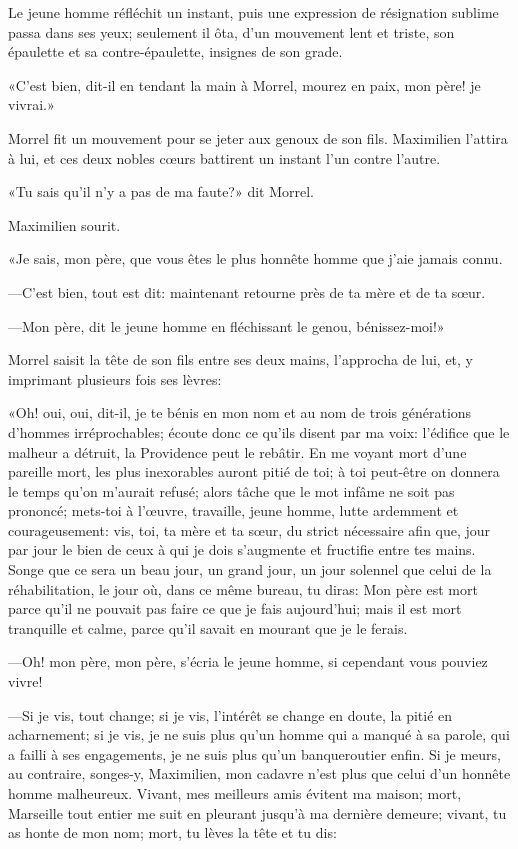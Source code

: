 Le jeune homme réfléchit un instant, puis une expression de résignation sublime passa dans ses yeux; seulement il ôta, d'un mouvement lent et triste, son épaulette et sa contre-épaulette, insignes de son grade.

«C'est bien, dit-il en tendant la main à Morrel, mourez en paix, mon père! je vivrai.»

Morrel fit un mouvement pour se jeter aux genoux de son fils. Maximilien l'attira à lui, et ces deux nobles cœurs battirent un instant l'un contre l'autre.

«Tu sais qu'il n'y a pas de ma faute?» dit Morrel.

Maximilien sourit.

«Je sais, mon père, que vous êtes le plus honnête homme que j'aie jamais connu.

—C'est bien, tout est dit: maintenant retourne près de ta mère et de ta sœur.

—Mon père, dit le jeune homme en fléchissant le genou, bénissez-moi!»

Morrel saisit la tête de son fils entre ses deux mains, l'approcha de lui, et, y imprimant plusieurs fois ses lèvres:

«Oh! oui, oui, dit-il, je te bénis en mon nom et au nom de trois générations d'hommes irréprochables; écoute donc ce qu'ils disent par ma voix: l'édifice que le malheur a détruit, la Providence peut le rebâtir. En me voyant mort d'une pareille mort, les plus inexorables auront pitié de toi; à toi peut-être on donnera le temps qu'on m'aurait refusé; alors tâche que le mot infâme ne soit pas prononcé; mets-toi à l'œuvre, travaille, jeune homme, lutte ardemment et courageusement: vis, toi, ta mère et ta sœur, du strict nécessaire afin que, jour par jour le bien de ceux à qui je dois s'augmente et fructifie entre tes mains. Songe que ce sera un beau jour, un grand jour, un jour solennel que celui de la réhabilitation, le jour où, dans ce même bureau, tu diras: Mon père est mort parce qu'il ne pouvait pas faire ce que je fais aujourd'hui; mais il est mort tranquille et calme, parce qu'il savait en mourant que je le ferais.

—Oh! mon père, mon père, s'écria le jeune homme, si cependant vous pouviez vivre!

—Si je vis, tout change; si je vis, l'intérêt se change en doute, la pitié en acharnement; si je vis, je ne suis plus qu'un homme qui a manqué à sa parole, qui a failli à ses engagements, je ne suis plus qu'un banqueroutier enfin. Si je meurs, au contraire, songes-y, Maximilien, mon cadavre n'est plus que celui d'un honnête homme malheureux. Vivant, mes meilleurs amis évitent ma maison; mort, Marseille tout entier me suit en pleurant jusqu'à ma dernière demeure; vivant, tu as honte de mon nom; mort, tu lèves la tête et tu dis:

